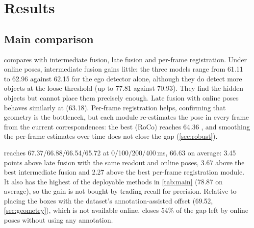 \section{Results}
\label{sec:results}

\subsection{Main comparison}
\label{sec:main}

\begin{table}[t]
  \centering
  \caption{\textbf{V2X-Seq validation under strict arrival with online poses.} \apseven and \apfive (\%) per latency budget $d$ and their mean. $^\dagger$Box-level methods on the released TraF-Align boxes with the same readout as \method (three frozen heads). $^\ddagger$Temporal median of CBM's per-frame estimates; the best of six smoothed external variants on the calibration split.}
  \label{tab:main}
  \small
  \setlength{\tabcolsep}{3.6pt}
\end{table}

 compares \method with intermediate fusion, late fusion and per-frame registration.
Under online poses, intermediate fusion gains little: the three models range from 61.11 to 62.96 \apseven against 62.15 for the ego detector alone, although they do detect more objects at the loose threshold (up to 77.81 \apfive against 70.93).
They find the hidden objects but cannot place them precisely enough.
Late fusion with online poses behaves similarly at \apseven (63.18).
Per-frame registration helps, confirming that geometry is the bottleneck, but each module re-estimates the pose in every frame from the current correspondences: the best (RoCo) reaches 64.36 \apseven, and smoothing the per-frame estimates over time does not close the gap (\cref{sec:robust}).

\method reaches 67.37/66.88/66.54/65.72 \apseven at 0/100/200/400\,ms, 66.63 on average: 3.45 points above late fusion with the same readout and online poses, 3.67 above the best intermediate fusion and 2.27 above the best per-frame registration module.
It also has the highest \apfive of the deployable methods in \cref{tab:main} (78.87 on average), so the gain is not bought by trading recall for precision.
Relative to placing the boxes with the dataset's annotation-assisted offset (69.52, \cref{sec:geometry}), which is not available online, \method closes 54\% of the gap left by online poses without using any annotation.

